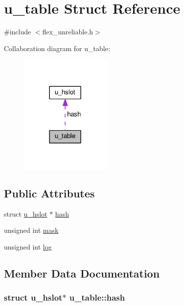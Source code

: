 \hypertarget{structu__table}{}\section{u\+\_\+table Struct Reference}
\label{structu__table}


{\ttfamily \#include $<$flex\+\_\+unreliable.\+h$>$}



Collaboration diagram for u\+\_\+table\+:\nopagebreak
\begin{figure}[H]
\begin{center}
\leavevmode
\includegraphics[width=129pt]{structu__table__coll__graph}
\end{center}
\end{figure}
\subsection*{Public Attributes}
\begin{DoxyCompactItemize}
\item 
struct \hyperlink{structu__hslot}{u\+\_\+hslot} $\ast$ \hyperlink{structu__table_a9d4512b1f9f38f0a6a24841ce2ca32a6}{hash}
\item 
unsigned int \hyperlink{structu__table_aeb1108e804777cac0e332f0310a78f09}{mask}
\item 
unsigned int \hyperlink{structu__table_ab9c33f2ba15bf3544b0176fbe59ccecd}{log}
\end{DoxyCompactItemize}


\subsection{Member Data Documentation}
\subsubsection[{\texorpdfstring{hash}{hash}}]{\setlength{\rightskip}{0pt plus 5cm}struct {\bf u\+\_\+hslot}$\ast$ u\+\_\+table\+::hash}\hypertarget{structu__table_a9d4512b1f9f38f0a6a24841ce2ca32a6}{}\label{structu__table_a9d4512b1f9f38f0a6a24841ce2ca32a6}
